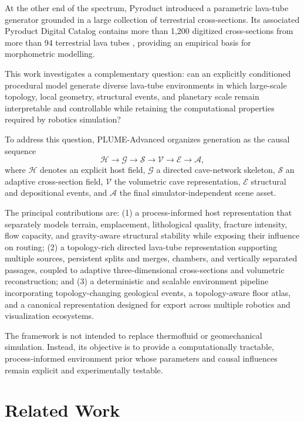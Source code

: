 \documentclass[conference]{IEEEtran}
\begin{document}
At the other end of the spectrum, Pyroduct \cite{pyroduct2026} introduced a parametric lava-tube generator grounded in a large collection of terrestrial cross-sections. Its associated Pyroduct Digital Catalog contains more than 1,200 digitized cross-sections from more than 94 terrestrial lava tubes \cite{pdc2025}, providing an empirical basis for morphometric modelling.

This work investigates a complementary question: can an explicitly conditioned procedural model generate diverse lava-tube environments in which large-scale topology, local geometry, structural events, and planetary scale remain interpretable and controllable while retaining the computational properties required by robotics simulation?

To address this question, PLUME-Advanced organizes generation as the causal sequence
\begin{equation}
\mathcal{H} \rightarrow \mathcal{G} \rightarrow \mathcal{S} \rightarrow \mathcal{V} \rightarrow \mathcal{E} \rightarrow \mathcal{A},
\label{eq:pipeline}
\end{equation}
where $\mathcal{H}$ denotes an explicit host field, $\mathcal{G}$ a directed cave-network skeleton, $\mathcal{S}$ an adaptive cross-section field, $\mathcal{V}$ the volumetric cave representation, $\mathcal{E}$ structural and depositional events, and $\mathcal{A}$ the final simulator-independent scene asset.

The principal contributions are: (1) a process-informed host representation that separately models terrain, emplacement, lithological quality, fracture intensity, flow capacity, and gravity-aware structural stability while exposing their influence on routing; (2) a topology-rich directed lava-tube representation supporting multiple sources, persistent splits and merges, chambers, and vertically separated passages, coupled to adaptive three-dimensional cross-sections and volumetric reconstruction; and (3) a deterministic and scalable environment pipeline incorporating topology-changing geological events, a topology-aware floor atlas, and a canonical representation designed for export across multiple robotics and visualization ecosystems.

The framework is not intended to replace thermofluid or geomechanical simulation. Instead, its objective is to provide a computationally tractable, process-informed environment prior whose parameters and causal influences remain explicit and experimentally testable.

\section{Related Work}
\end{document}
